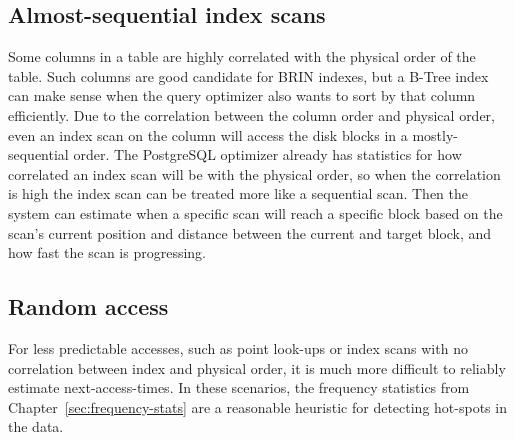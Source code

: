 

\subsection{Almost-sequential index scans}
\label{sec:idx_seq}

Some columns in a table are highly correlated with the physical order of the table. Such columns are good candidate for BRIN indexes, but a B-Tree index can make sense when the query optimizer also wants to sort by that column efficiently. Due to the correlation between the column order and physical order, even an index scan on the column will access the disk blocks in a mostly-sequential order. The PostgreSQL optimizer already has statistics for how correlated an index scan will be with the physical order, so when the correlation is high the index scan can be treated more like a sequential scan. Then the system can estimate when a specific scan will reach a specific block based on the scan's current position and distance between the current and target block, and how fast the scan is progressing.




\subsection{Random access}

For less predictable accesses, such as point look-ups or index scans with no correlation between index and physical order, it is much more difficult to reliably estimate next-access-times. In these scenarios, the frequency statistics from Chapter~\ref{sec:frequency-stats} are a reasonable heuristic for detecting hot-spots in the data.
